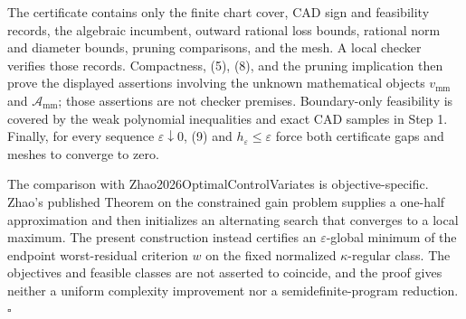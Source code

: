 The certificate contains only the finite chart cover, CAD sign and feasibility records, the algebraic incumbent, outward rational loss bounds, rational norm and diameter bounds, pruning comparisons, and the mesh.  A local checker verifies those records.  Compactness, (5), (8), and the pruning implication then prove the displayed assertions involving the unknown mathematical objects \(v_{\mathrm{mm}}\) and \(\mathcal A_{\mathrm{mm}}\); those assertions are not checker premises.  Boundary-only feasibility is covered by the weak polynomial inequalities and exact CAD samples in Step 1.  Finally, for every sequence \(\varepsilon\downarrow0\), (9) and \(h_\varepsilon\le\varepsilon\) force both certificate gaps and meshes to converge to zero.

The comparison with Zhao2026OptimalControlVariates is objective-specific.  Zhao's published Theorem on the constrained gain problem supplies a one-half approximation and then initializes an alternating search that converges to a local maximum.  The present construction instead certifies an \(\varepsilon\)-global minimum of the endpoint worst-residual criterion \(w\) on the fixed normalized \(\kappa\)-regular class.  The objectives and feasible classes are not asserted to coincide, and the proof gives neither a uniform complexity improvement nor a semidefinite-program reduction. \(\square\)